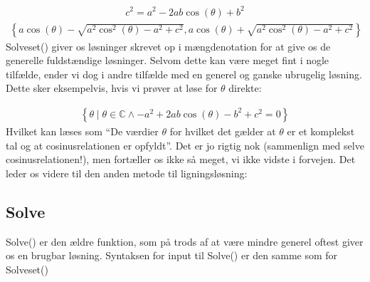 \documentclass[letterpaper,10pt,english]{jupyterBook}
\begin{document}
\begin{sphinxVerbatim}[commandchars=\\\{\}]
   
\end{sphinxVerbatim}
\begin{equation*}
\begin{split}\displaystyle c^{2} = a^{2} - 2 a b \cos{\left(\theta \right)} + b^{2}\end{split}
\end{equation*}\begin{equation*}
\begin{split}\displaystyle \left\{a \cos{\left(\theta \right)} - \sqrt{a^{2} \cos^{2}{\left(\theta \right)} - a^{2} + c^{2}}, a \cos{\left(\theta \right)} + \sqrt{a^{2} \cos^{2}{\left(\theta \right)} - a^{2} + c^{2}}\right\}\end{split}
\end{equation*}
Solveset() giver os løsninger skrevet op i mængdenotation for at give os de generelle fuldstændige løsninger. Selvom dette kan være meget fint i nogle tilfælde, ender vi dog i andre tilfælde med en generel og ganske ubrugelig løsning. Dette sker eksempelvis, hvis vi prøver at løse for \(\theta\) direkte:

\begin{sphinxVerbatim}[commandchars=\\\{\}]
 
\end{sphinxVerbatim}
\begin{equation*}
\begin{split}\displaystyle \left\{\theta \mid \theta \in \mathbb{C} \wedge - a^{2} + 2 a b \cos{\left(\theta \right)} - b^{2} + c^{2} = 0 \right\}\end{split}
\end{equation*}
Hvilket kan læses som “De værdier \(\theta\) for hvilket det gælder at \(\theta\) er et komplekst tal og at cosinusrelationen er opfyldt”. Det er jo rigtig nok (sammenlign med selve cosinusrelationen!), men fortæller os ikke så meget, vi ikke vidste i forvejen. Det leder os videre til den anden metode til ligningsløsning:


\subsection{Solve}
\label{\detokenize{notebooks/sympy/Notebook3_ligninger:solve}}
Solve() er den ældre funktion, som på trods af at være mindre generel oftest giver os en brugbar løsning. Syntaksen for input til Solve() er den samme som for Solveset()
\end{document}
